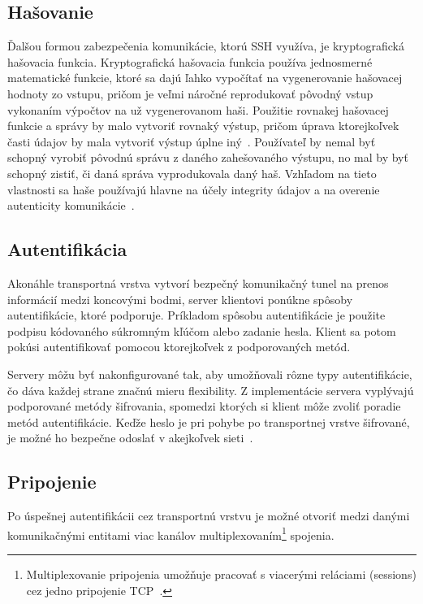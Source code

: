 \subsection{Hašovanie}\label{subsec:hasovanie}

Ďalšou formou zabezpečenia komunikácie, ktorú SSH využíva, je kryptografická hašovacia funkcia.
Kryptografická hašovacia funkcia používa jednosmerné matematické funkcie, ktoré sa dajú ľahko vypočítať na vygenerovanie
hašovacej hodnoty zo vstupu, pričom je veľmi náročné reprodukovať pôvodný vstup vykonaním výpočtov na už vygenerovanom haši.
Použitie rovnakej hašovacej funkcie a správy by malo vytvoriť rovnaký výstup, pričom úprava ktorejkoľvek časti údajov by
mala vytvoriť výstup úplne iný~\cite{EDGAR201733}.
Používateľ by nemal byť schopný vyrobiť pôvodnú správu z daného zahešovaného výstupu, no mal by byť schopný zistiť, či daná správa
vyprodukovala daný haš.
Vzhľadom na tieto vlastnosti sa haše používajú hlavne na účely integrity údajov a na overenie autenticity komunikácie~\cite{SshEncryption}.

\subsection{Autentifikácia}\label{subsec:autentifikacia}

Akonáhle transportná vrstva vytvorí bezpečný komunikačný tunel na prenos informácií medzi koncovými bodmi, server klientovi
ponúkne spôsoby autentifikácie, ktoré podporuje.
Príkladom spôsobu autentifikácie je použite podpisu kódovaného súkromným kľúčom alebo zadanie hesla.
Klient sa potom pokúsi autentifikovať pomocou ktorejkoľvek z podporovaných metód.

Servery môžu byť nakonfigurované tak, aby umožňovali rôzne typy autentifikácie, čo dáva každej strane značnú mieru flexibility.
Z implementácie servera vyplývajú podporované metódy šifrovania, spomedzi ktorých si klient môže zvoliť poradie metód autentifikácie.
Keďže heslo je pri pohybe po transportnej vrstve šifrované, je možné ho bezpečne odoslať v akejkoľvek sieti~\cite{SshSecurity}.

\subsection{Pripojenie}\label{subsec:pripojenie}

Po úspešnej autentifikácii cez transportnú vrstvu je možné otvoriť medzi danými komunikačnými entitami viac kanálov multiplexovaním\footnote{Multiplexovanie
pripojenia umožňuje pracovať s viacerými reláciami (sessions) cez jedno pripojenie TCP~\cite{SshSecurity}.} spojenia.

